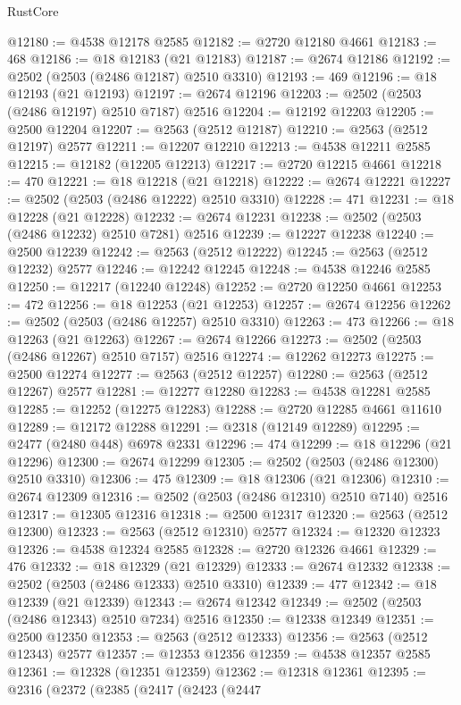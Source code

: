 \begin{lexlean}{RustCore}
\begin{coremodule}
@12180 := @4538 @12178 @2585
@12182 := @2720 @12180 @4661
@12183 := 468
@12186 := @18 @12183 (@21 @12183)
@12187 := @2674 @12186
@12192 := @2502 (@2503 (@2486 @12187) @2510 @3310)
@12193 := 469
@12196 := @18 @12193 (@21 @12193)
@12197 := @2674 @12196
@12203 := @2502 (@2503 (@2486 @12197) @2510 @7187) @2516
@12204 := @12192 @12203
@12205 := @2500 @12204
@12207 := @2563 (@2512 @12187)
@12210 := @2563 (@2512 @12197) @2577
@12211 := @12207 @12210
@12213 := @4538 @12211 @2585
@12215 := @12182 (@12205 @12213)
@12217 := @2720 @12215 @4661
@12218 := 470
@12221 := @18 @12218 (@21 @12218)
@12222 := @2674 @12221
@12227 := @2502 (@2503 (@2486 @12222) @2510 @3310)
@12228 := 471
@12231 := @18 @12228 (@21 @12228)
@12232 := @2674 @12231
@12238 := @2502 (@2503 (@2486 @12232) @2510 @7281) @2516
@12239 := @12227 @12238
@12240 := @2500 @12239
@12242 := @2563 (@2512 @12222)
@12245 := @2563 (@2512 @12232) @2577
@12246 := @12242 @12245
@12248 := @4538 @12246 @2585
@12250 := @12217 (@12240 @12248)
@12252 := @2720 @12250 @4661
@12253 := 472
@12256 := @18 @12253 (@21 @12253)
@12257 := @2674 @12256
@12262 := @2502 (@2503 (@2486 @12257) @2510 @3310)
@12263 := 473
@12266 := @18 @12263 (@21 @12263)
@12267 := @2674 @12266
@12273 := @2502 (@2503 (@2486 @12267) @2510 @7157) @2516
@12274 := @12262 @12273
@12275 := @2500 @12274
@12277 := @2563 (@2512 @12257)
@12280 := @2563 (@2512 @12267) @2577
@12281 := @12277 @12280
@12283 := @4538 @12281 @2585
@12285 := @12252 (@12275 @12283)
@12288 := @2720 @12285 @4661 @11610
@12289 := @12172 @12288
@12291 := @2318 (@12149 @12289)
@12295 := @2477 (@2480 @448) @6978 @2331
@12296 := 474
@12299 := @18 @12296 (@21 @12296)
@12300 := @2674 @12299
@12305 := @2502 (@2503 (@2486 @12300) @2510 @3310)
@12306 := 475
@12309 := @18 @12306 (@21 @12306)
@12310 := @2674 @12309
@12316 := @2502 (@2503 (@2486 @12310) @2510 @7140) @2516
@12317 := @12305 @12316
@12318 := @2500 @12317
@12320 := @2563 (@2512 @12300)
@12323 := @2563 (@2512 @12310) @2577
@12324 := @12320 @12323
@12326 := @4538 @12324 @2585
@12328 := @2720 @12326 @4661
@12329 := 476
@12332 := @18 @12329 (@21 @12329)
@12333 := @2674 @12332
@12338 := @2502 (@2503 (@2486 @12333) @2510 @3310)
@12339 := 477
@12342 := @18 @12339 (@21 @12339)
@12343 := @2674 @12342
@12349 := @2502 (@2503 (@2486 @12343) @2510 @7234) @2516
@12350 := @12338 @12349
@12351 := @2500 @12350
@12353 := @2563 (@2512 @12333)
@12356 := @2563 (@2512 @12343) @2577
@12357 := @12353 @12356
@12359 := @4538 @12357 @2585
@12361 := @12328 (@12351 @12359)
@12362 := @12318 @12361
@12395 := @2316
    (@2372
      (@2385
        (@2417
          (@2423
            (@2447

\end{coremodule}
\end{lexlean}
